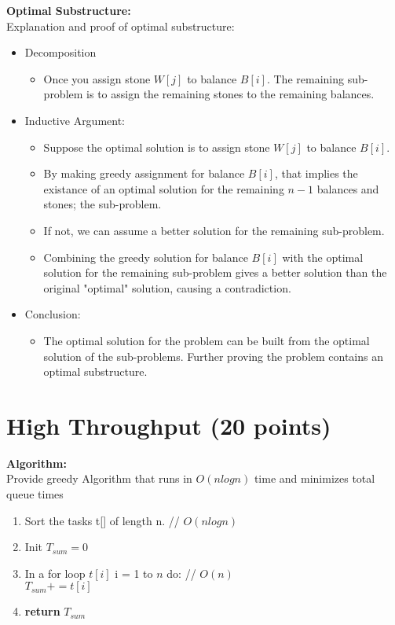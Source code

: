 \documentclass{article}[12pt]
\begin{document}
\pagebreak
\noindent\textbf{Optimal Substructure:} \\
Explanation and proof of optimal substructure: \\
\begin{itemize}
  \item Decomposition
    \begin{itemize}
      \item Once you assign stone $W[j]$ to balance $B[i]$.
        The remaining sub-problem is to assign the remaining stones to the remaining balances.
    \end{itemize}
  \item Inductive Argument:
    \begin{itemize}
      \item Suppose the optimal solution is to assign stone $W[j]$ to balance $B[i]$.
      \item By making greedy assignment for balance $B[i]$, that implies
        the existance of an optimal solution for the remaining $n-1$ balances and stones; the sub-problem.
      \item If not, we can assume a better solution for the remaining sub-problem.
      \item Combining the greedy solution for balance $B[i]$ with the optimal solution for the remaining sub-problem
        gives a better solution than the original "optimal" solution, causing a contradiction.
    \end{itemize}
  \item Conclusion:
    \begin{itemize}
      \item The optimal solution for the problem can be built from the optimal solution of the sub-problems.
        Further proving the problem contains an optimal substructure.
    \end{itemize}
\end{itemize}

\newpage
\section{High Throughput (20 points)}
\noindent\textbf{Algorithm:} \\
   Provide greedy Algorithm that runs in $O(nlogn)$ time and minimizes total queue times
    \begin{enumerate}
      \item Sort the tasks t[] of length n.  // $O(nlogn)$
      \item Init $T_{sum} = 0$
      \item In a for loop $t[i]$ i = 1 to $n$ do: // $O(n)$ \\
        $T_{sum} += t[i]$
      \item \textbf{return} $T_{sum}$
    \end{enumerate}
\end{document}
